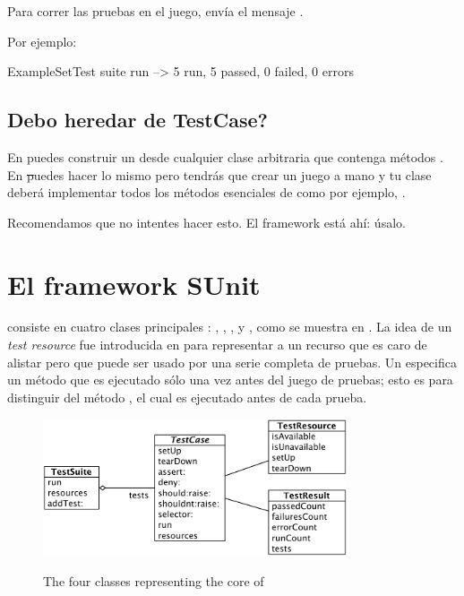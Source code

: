 \documentclass[a4paper,10pt,twoside]{book}
\begin{document}
Para correr las pruebas en el juego, env\'ia el mensaje .

Por ejemplo:

\begin{code}{}
ExampleSetTest suite run --> 5 run, 5 passed, 0 failed, 0 errors
\end{code}

\subsection{\¿ Debo heredar de TestCase?}

En \JUnit{} puedes construir un  desde cualquier clase arbitraria
que contenga m\'etodos . En \st puedes hacer lo mismo pero tendr\'as
que crear un juego a mano y tu clase deber\'a implementar todos los m\'etodos esenciales de 
  como por ejemplo, .

Recomendamos que no intentes hacer esto. El framework est\'a ah\'i: \'usalo.


\section{El framework SUnit}

\sunit consiste en cuatro clases principales : ,
, , y , como se muestra en .
La idea de un \emph{test resource} fue introducida en  para representar a un recurso
que es caro de alistar pero que puede ser usado por una serie completa de pruebas.  Un 
especifica un m\'etodo  que es ejecutado s\'olo una vez antes del juego de pruebas;
esto es para distinguir del m\'etodo , el cual es ejecutado antes de cada prueba. 


\begin{figure}[htb]
  \begin{center}
		{\includegraphics[width=0.8\textwidth]{sunit-classes}}
	\caption{The four classes representing the core of \SUnit}
  \end{center}
\end{figure}
\end{document}
